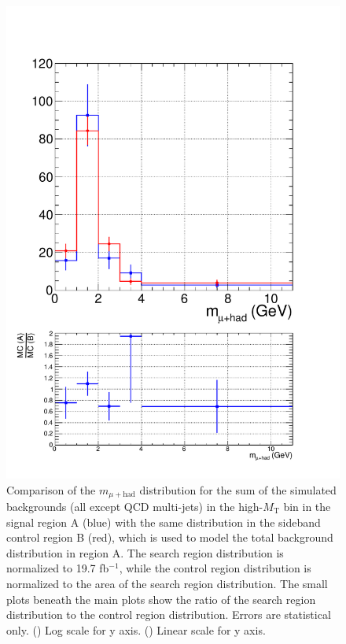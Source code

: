 \begin{figure}[hbtp]
\begin{center}
    \includegraphics[width=\cmsFigWidth]{figures/MCClosure_linear_highMT_v87}
    \caption{Comparison of the $m_{\mu+\text{had}}$ distribution for the sum of the simulated backgrounds (all except QCD multi-jets) in the high-$M_{\text{T}}$ bin in the signal region A (blue) with the same distribution in the sideband control region B (red), which is used to model the total background distribution in region A.  The search region distribution is normalized to 19.7 fb$^{-1}$, while the control region distribution is normalized to the area of the search region distribution.  The small plots beneath the main plots show the ratio of the search region distribution to the control region distribution.  Errors are statistical only.  (\cmsLeft) Log scale for y axis.  (\cmsRight) Linear scale for y axis.}
    \label{fig:MC-regA-vs-regB-highMT}
  \end{center}
\end{figure}

